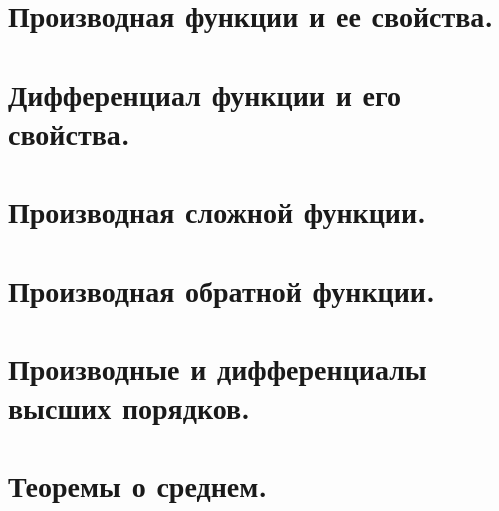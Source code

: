 \documentclass[12pt]{article}
\begin{document}
\begin{sloppypar}
    \section{Производная функции и ее свойства.}

    \section{Дифференциал функции и его свойства.}

    \section{Производная сложной функции.}

    \section{Производная обратной функции.}

    \section{Производные и дифференциалы высших порядков.}

    \section{Теоремы о среднем.}


\end{sloppypar}
\end{document}
